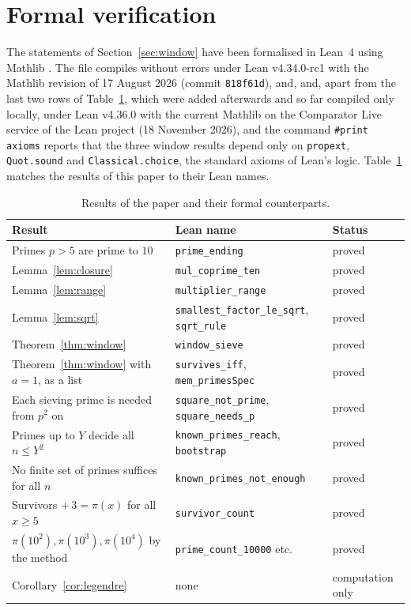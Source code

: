 \documentclass[11pt]{amsart}
\theoremstyle{definition}
\theoremstyle{remark}
\newcommand{\lean}[1]{\texttt{#1}}
\begin{document}
\section{Formal verification}\label{sec:formal}

The statements of Section~\ref{sec:window} have been formalised in Lean~4 \cite{Lean4} using Mathlib \cite{Mathlib2020}. The file compiles without errors under Lean v4.34.0-rc1 with the Mathlib revision of 17 August 2026 (commit \texttt{818f61d}), and, and, apart from the last two rows of Table~\ref{tab:lean}, which were added afterwards and so far compiled only locally, under Lean v4.36.0 with the current Mathlib on the Comparator Live service of the Lean project (18 November 2026), and the command \lean{\#print axioms} reports that the three window results depend only on \lean{propext}, \lean{Quot.sound} and \lean{Classical.choice}, the standard axioms of Lean's logic. Table~\ref{tab:lean} matches the results of this paper to their Lean names.

\begin{table}[ht]
\centering
\small
\caption{Results of the paper and their formal counterparts.}\label{tab:lean}
\begin{tabular}{@{}l l l@{}}
\toprule
Result & Lean name & Status\\
\midrule
Primes $p>5$ are prime to $10$ & \lean{prime\_ending} & proved\\
Lemma~\ref{lem:closure} & \lean{mul\_coprime\_ten} & proved\\
Lemma~\ref{lem:range} & \lean{multiplier\_range} & proved\\
Lemma~\ref{lem:sqrt} & \lean{smallest\_factor\_le\_sqrt}, \lean{sqrt\_rule} & proved\\
Theorem~\ref{thm:window} & \lean{window\_sieve} & proved\\
Theorem~\ref{thm:window} with $a=1$, as a list & \lean{survives\_iff}, \lean{mem\_primesSpec} & proved\\
Each sieving prime is needed from $p^2$ on & \lean{square\_not\_prime}, \lean{square\_needs\_p} & proved\\
Primes up to $Y$ decide all $n\le Y^2$ & \lean{known\_primes\_reach}, \lean{bootstrap} & proved\\
No finite set of primes suffices for all $n$ & \lean{known\_primes\_not\_enough} & proved\\
Survivors $+\,3=\pi(x)$ for all $x\ge5$ & \lean{survivor\_count} & proved\\
$\pi(10^2),\pi(10^3),\pi(10^4)$ by the method & \lean{prime\_count\_10000} etc. & proved\\
Corollary~\ref{cor:legendre} & none & computation only\\
\bottomrule
\end{tabular}
\end{table}
\end{document}
